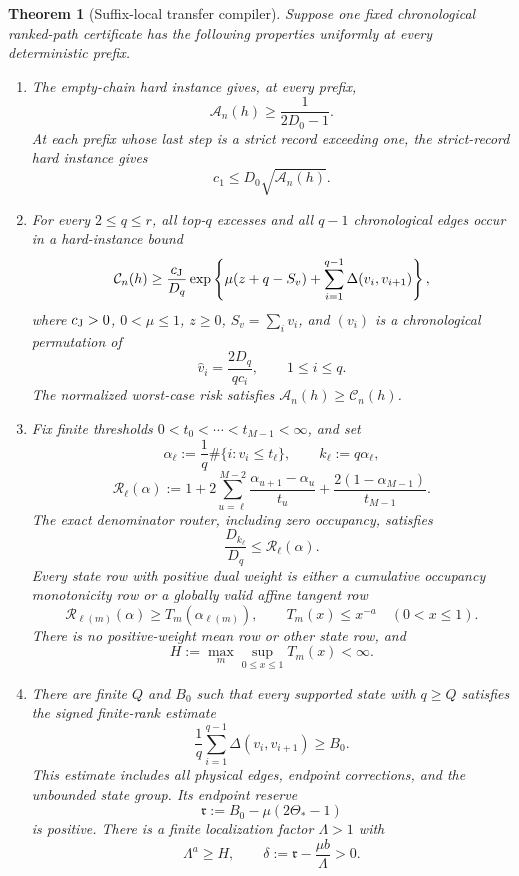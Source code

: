 \documentclass[11pt]{article}
\newtheorem{theorem}{Theorem}[section]
\theoremstyle{definition}
\theoremstyle{remark}
\newcommand{\anyrisk}{\mathcal A}
\begin{document}
\begin{theorem}[Suffix-local transfer compiler]
\label{thm:any-compiler}
Suppose one fixed chronological ranked-path certificate has the following
properties uniformly at every deterministic prefix.

\begin{enumerate}
\item The empty-chain hard instance gives, at every prefix,
\begin{equation}
 \anyrisk_n(h)\ge\frac1{2D_0-1}.
 \label{eq:any-empty-arm}
\end{equation}
At each prefix whose last step is a strict record exceeding one, the
strict-record hard instance gives
\begin{equation}
 c_1\le D_0\sqrt{\anyrisk_n(h)}.
 \label{eq:any-record-arms}
\end{equation}

\item For every \(2\le q\le r\), all top-\(q\) excesses and all
\(q-1\) chronological edges occur in a hard-instance bound
\begin{equation}
 \mathcal C_n(h)\ge\frac{c_{\rm J}}{D_q}
 \exp\left\{\mu(z+q-S_v)
 +\sum_{i=1}^{q-1}\Delta(v_i,v_{i+1})\right\},
 \label{eq:any-chronological-path}
\end{equation}
where \(c_{\rm J}>0\), \(0<\mu\le1\), \(z\ge0\),
\(S_v=\sum_i v_i\), and \((v_i)\) is a chronological permutation of
\[
 \widehat v_i=\frac{2D_q}{qc_i},\qquad 1\le i\le q.
\]
The normalized worst-case risk satisfies
\(\anyrisk_n(h)\ge\mathcal C_n(h)\).

\item Fix finite thresholds \(0<t_0<\cdots<t_{M-1}<\infty\), and set
\[
 \alpha_\ell:=\frac1q\#\{i:v_i\le t_\ell\},\qquad
 k_\ell:=q\alpha_\ell,
\]
\[
 \mathscr R_\ell(\alpha):=1+
 2\sum_{u=\ell}^{M-2}\frac{\alpha_{u+1}-\alpha_u}{t_u}
 +\frac{2(1-\alpha_{M-1})}{t_{M-1}}.
\]
The exact denominator router, including zero occupancy, satisfies
\[
 \frac{D_{k_\ell}}{D_q}\le\mathscr R_\ell(\alpha).
\]
Every state row with positive dual weight is either a cumulative occupancy
monotonicity row or a globally valid affine tangent row
\[
 \mathscr R_{\ell(m)}(\alpha)\ge T_m(\alpha_{\ell(m)}),
 \qquad T_m(x)\le x^{-a}\quad(0<x\le1).
\]
There is no positive-weight mean row or other state row, and
\[
 H:=\max_m\sup_{0\le x\le1}T_m(x)<\infty.
\]

\item There are finite \(Q\) and \(B_0\) such that every supported state
with \(q\ge Q\) satisfies the signed finite-rank estimate
\[
 \frac1q\sum_{i=1}^{q-1}\Delta(v_i,v_{i+1})\ge B_0.
\]
This estimate includes all physical edges, endpoint corrections, and the
unbounded state group.  Its endpoint reserve
\[
 \mathfrak r:=B_0-\mu(2\Theta_*-1)
\]
is positive.  There is a finite localization factor \(\Lambda>1\) with
\begin{equation}
 \Lambda^a\ge H,
 \qquad
 \delta:=\mathfrak r-\frac{\mu b}{\Lambda}>0.
 \label{eq:any-localization-reserve}
\end{equation}
\end{enumerate}


\end{theorem}
\end{document}
